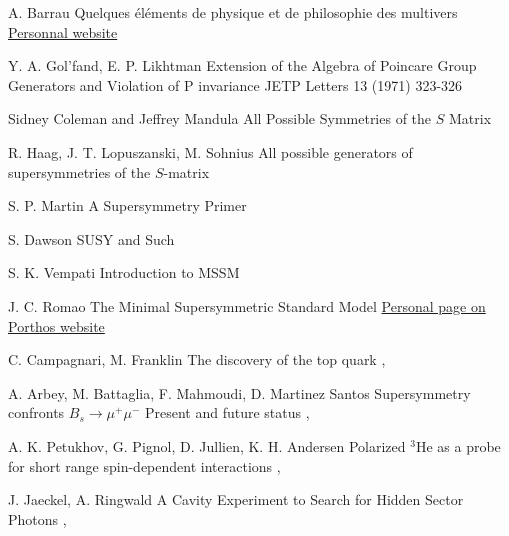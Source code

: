 {A. Barrau}
{Quelques éléments de physique et de philosophie des multivers}
{\href{http://lpsc.in2p3.fr/barrau/aurelien/multivers_lpsc.pdf}{Personnal website}}

{Y. A. Gol'fand, E. P. Likhtman}
{Extension of the Algebra of Poincare Group Generators and Violation of P invariance}
{JETP Letters 13 (1971) 323-326}

{Sidney Coleman and Jeffrey Mandula}
{All Possible Symmetries of the $S$ Matrix}
{}

{R. Haag, J. T. Lopuszanski, M. Sohnius}
{All possible generators of supersymmetries of the $S$-matrix}
{}

{S. P. Martin}
{A Supersymmetry Primer}
{}

{S. Dawson}
{SUSY and Such}
{}

{S. K. Vempati}
{Introduction to MSSM}
{}

{J. C. Romao}
{The Minimal Supersymmetric Standard Model}
{\href{http://porthos.ist.utl.pt/~romao/homepage/publications/}{Personal page on Porthos website}}


{C. Campagnari, M. Franklin}
{The discovery of the top quark}
{, }

{A. Arbey, M. Battaglia, F. Mahmoudi, D. Martinez Santos}
{Supersymmetry confronts $B_s \rightarrow \mu^+ \mu^-$ Present and future status}
{, }

{A. K. Petukhov, G. Pignol, D. Jullien, K. H. Andersen}
{Polarized $^3$He as a probe for short range spin-dependent interactions}
{, }

{J. Jaeckel, A. Ringwald}
{A Cavity Experiment to Search for Hidden Sector Photons}
{, }

